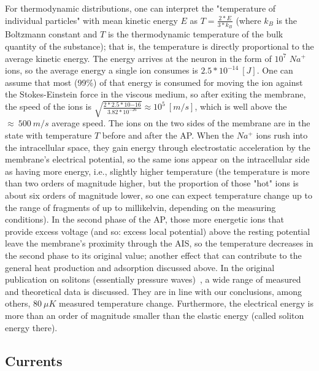 	For thermodynamic distributions, one can interpret the "temperature of individual particles" with mean kinetic energy $E$ as $T=\frac{2*E}{3*k_B}$ (where $k_B$ is the Boltzmann constant and $T$ is the thermodynamic temperature of the
	bulk quantity of the substance); that is, the temperature is directly proportional to the average kinetic energy.
	The energy arrives at the neuron in the form of $10^7$ $Na^+$ ions,
	so the average energy a single ion consumes is $2.5*10^{-14}~[J]$. One can assume that most (99\%) of that energy is consumed for moving
	the ion against the Stokes-Einstein force in the viscous medium, 
	so after exiting the membrane, the speed of the ions is $\sqrt{\frac{2*2.5*10{-16}}{3.82*10^{-26}}}\approx 10^5~[m/s]$, 
	which is well above the $\approx~500~m/s$ average speed.
	The ions on the two sides of the membrane are in the state with temperature $T$ before and after the \gls{AP}. When the $Na^+$ ions rush into the intracellular space, they gain energy through electrostatic acceleration by the membrane's electrical potential, so the same ions appear on the intracellular side as having more energy, i.e., slightly higher temperature (the temperature is more than two orders of magnitude higher, but the proportion of those "hot" ions is about six orders of magnitude lower, so one can expect temperature change up to the range of fragments of up to millikelvin, depending on the measuring conditions).
	In the second phase of the \gls{AP}, those more energetic ions that provide excess voltage (and so: excess local potential) above the resting potential leave the membrane's proximity through the \gls{AIS},
	so the temperature decreases in the second phase to its original value; 
	another effect that can contribute to the general heat production and adsorption discussed above.
	In the original publication on solitons (essentially pressure waves)~\cite{SolitonPropagation:2005}, a wide range of measured and theoretical data is discussed. They are in line with our conclusions, among others, $80\ \mu K$ measured temperature change.
	Furthermore, the electrical energy is more than an order of magnitude smaller than the elastic energy (called soliton energy there).
	

\subsection{Currents\label{sec:Single-UnifiedCurrents}}
